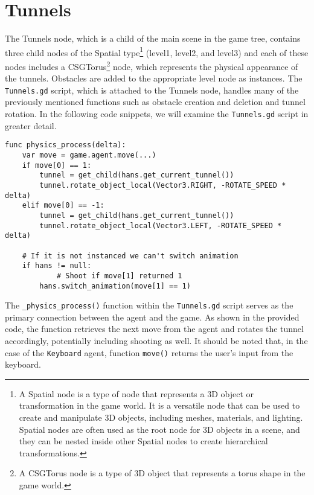\section{Tunnels}
\label{tunnel_script}
The Tunnels node, which is a child of the main scene in the game tree, contains three child nodes of the Spatial type\footnote{A Spatial node is a type of node that represents a 3D object or transformation in the game world. It is a versatile node that can be used to create and manipulate 3D objects, including meshes, materials, and lighting. Spatial nodes are often used as the root node for 3D objects in a scene, and they can be nested inside other Spatial nodes to create hierarchical transformations.} (level1, level2, and level3) and each of these nodes includes a CSGTorus\footnote{ A CSGTorus node is a type of 3D object that represents a torus shape in the game world.} node, which represents the physical appearance of the tunnels. Obstacles are added to the appropriate level node as instances. The \texttt{Tunnels.gd} script, which is attached to the Tunnels node, handles many of the previously mentioned functions such as obstacle creation and deletion and tunnel rotation. In the following code snippets, we will examine the \texttt{Tunnels.gd} script in greater detail.

\begin{center}
\hrulefill
\begin{lstlisting}
func physics_process(delta):
    var move = game.agent.move(...)
    if move[0] == 1:
        tunnel = get_child(hans.get_current_tunnel())
        tunnel.rotate_object_local(Vector3.RIGHT, -ROTATE_SPEED * delta)
    elif move[0] == -1:
        tunnel = get_child(hans.get_current_tunnel())
        tunnel.rotate_object_local(Vector3.LEFT, -ROTATE_SPEED * delta)
	
	# If it is not instanced we can't switch animation
    if hans != null:
    		# Shoot if move[1] returned 1
        hans.switch_animation(move[1] == 1)
\end{lstlisting}
\hrulefill
\end{center}

The \texttt{\_physics\_process()} function within the \texttt{Tunnels.gd} script serves as the primary connection between the agent and the game. As shown in the provided code, the function retrieves the next move from the agent and rotates the tunnel accordingly, potentially including shooting as well. It should be noted that, in the case of the \texttt{Keyboard} agent, function \texttt{move()} returns the user's input from the keyboard.

